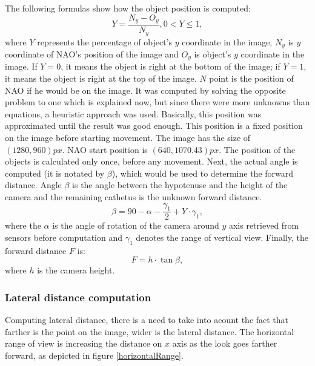         The following formulas show how the object position is computed:
        \begin{equation}
          Y = \frac{N_{y} - O_{y}}{N_{y}},  0 < Y \leq 1,
        \end{equation}
        where \(Y\) represents the percentage of object's \(y\) coordinate in the image, \( N_{y}\) is \( y\) coordinate of NAO's position of the image and \( O_{y}\) is object's \( y\) coordinate in the image. If \(Y = 0\), it means the object is right at the bottom of the image; if \(Y = 1\), it means the object is right at the top of the image. \(N\) point is the position of NAO if he would be on the image. It was computed by solving the opposite problem to one which is explained now, but since there were more unknowns than equations, a heuristic approach was used. Basically, this position was approximated until the result was good enough. This position is a fixed position on the image before starting movement. The image has the size of \((1280,960) px\). NAO start position is \((640, 1070.43) px\). The position of the objects is calculated only once, before any movement. Next, the actual angle is computed (it is notated by \(\beta\)), which would be used to determine the forward distance. Angle \(\beta\) is the angle between the hypotenuse and the height of the camera and the remaining cathetus is the unknown forward distance.
        \begin{equation}
          \beta = 90 - \alpha - \frac{\gamma_{1}}{2} + Y\cdot \gamma_{1},
        \end{equation}
        where the \(\alpha\) is the angle of rotation of the camera around \(y\) axis retrieved from sensors before computation and \( \gamma_{1}\) denotes the range of vertical view. Finally, the forward distance \(F\) is:
        \begin{equation}
          F = h\cdot \tan \beta,
        \end{equation}
        where \(h\) is the camera height.

      \subsubsection{Lateral distance computation}
        Computing lateral distance, there is a need to take into acount the fact that farther is the point on the image, wider is the lateral distance. The horizontal range of view is increasing the distance on \(x\) axis as the look goes farther forward, as depicted in figure \ref{horizontalRange}.
        
